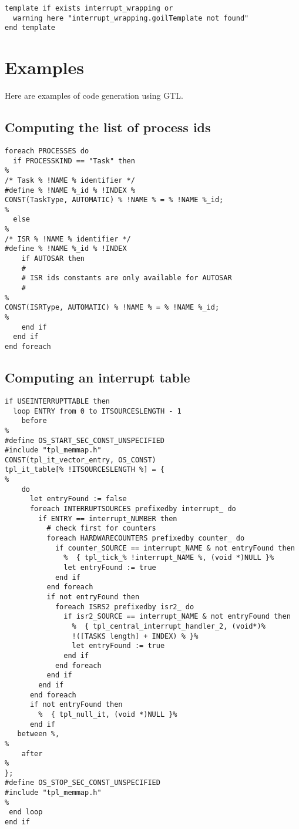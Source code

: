 \begin{lstlisting}
template if exists interrupt_wrapping or
  warning here "interrupt_wrapping.goilTemplate not found"
end template
\end{lstlisting}

\section{Examples}

Here are examples of code generation using GTL.

\subsection{Computing the list of process ids}

\begin{lstlisting}
foreach PROCESSES do
  if PROCESSKIND == "Task" then
%
/* Task % !NAME % identifier */
#define % !NAME %_id % !INDEX %
CONST(TaskType, AUTOMATIC) % !NAME % = % !NAME %_id;
%
  else
%
/* ISR % !NAME % identifier */
#define % !NAME %_id % !INDEX 
    if AUTOSAR then
    #
    # ISR ids constants are only available for AUTOSAR
    #
%
CONST(ISRType, AUTOMATIC) % !NAME % = % !NAME %_id;
%
    end if
  end if
end foreach
\end{lstlisting}

\subsection{Computing an interrupt table}

\begin{lstlisting}
if USEINTERRUPTTABLE then
  loop ENTRY from 0 to ITSOURCESLENGTH - 1
    before
%
#define OS_START_SEC_CONST_UNSPECIFIED
#include "tpl_memmap.h"
CONST(tpl_it_vector_entry, OS_CONST)
tpl_it_table[% !ITSOURCESLENGTH %] = {
%
    do
      let entryFound := false
      foreach INTERRUPTSOURCES prefixedby interrupt_ do
        if ENTRY == interrupt_NUMBER then
          # check first for counters
          foreach HARDWARECOUNTERS prefixedby counter_ do
            if counter_SOURCE == interrupt_NAME & not entryFound then
              %  { tpl_tick_% !interrupt_NAME %, (void *)NULL }%
              let entryFound := true
            end if
          end foreach
          if not entryFound then
            foreach ISRS2 prefixedby isr2_ do
              if isr2_SOURCE == interrupt_NAME & not entryFound then
                %  { tpl_central_interrupt_handler_2, (void*)%
                !([TASKS length] + INDEX) % }%
                let entryFound := true
              end if
            end foreach
          end if
        end if
      end foreach
      if not entryFound then
        %  { tpl_null_it, (void *)NULL }%
      end if
   between %,
%
    after
%
};
#define OS_STOP_SEC_CONST_UNSPECIFIED
#include "tpl_memmap.h"
%
 end loop
end if
\end{lstlisting}

